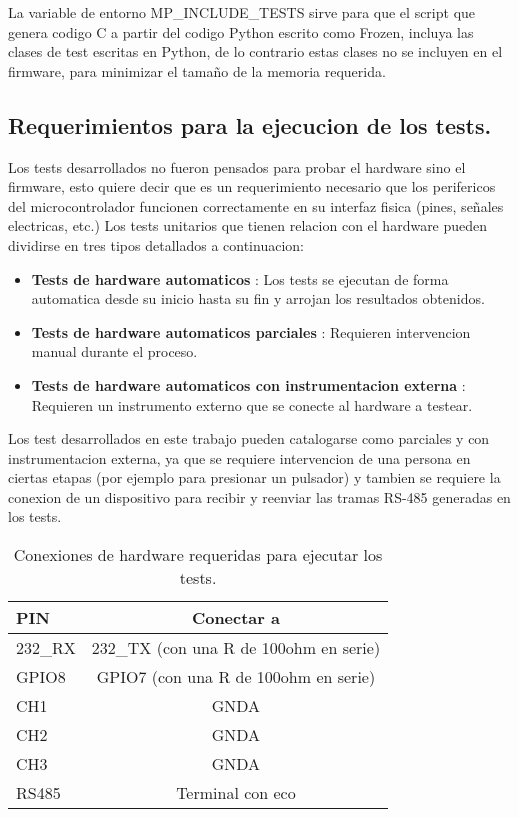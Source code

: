 La variable de entorno MP\_INCLUDE\_TESTS sirve para que el script que genera codigo C a partir del codigo Python escrito como Frozen, incluya las clases de test escritas en Python, de lo contrario estas clases no se incluyen en el firmware, para minimizar el tamaño de la memoria requerida.

\subsection{Requerimientos para la ejecucion de los tests.}
\label{sec:requerimientosEjecucionTests}

Los tests desarrollados no fueron pensados para probar el hardware sino el firmware, esto quiere decir que es un requerimiento necesario que los perifericos del microcontrolador funcionen correctamente en su interfaz fisica (pines, señales electricas, etc.)
Los tests unitarios que tienen relacion con el hardware pueden dividirse en tres tipos\cite{tdd} detallados a continuacion:

\begin{itemize}
	\item \textbf{Tests de hardware automaticos} : Los tests se ejecutan de forma automatica desde su inicio hasta su fin y arrojan los resultados obtenidos.
	\item \textbf{Tests de hardware automaticos parciales} : Requieren intervencion manual durante el proceso.
	\item \textbf{Tests de hardware automaticos con instrumentacion externa} : Requieren un instrumento externo que se conecte al hardware a testear.
\end{itemize}

Los test desarrollados en este trabajo pueden catalogarse como parciales y con instrumentacion externa, ya que se requiere intervencion de una persona en ciertas etapas (por ejemplo para presionar un pulsador) y tambien se requiere la conexion de un dispositivo para recibir y reenviar las tramas RS-485 generadas en los tests.

\begin{table}[h]
	\centering
	\caption[]{Conexiones de hardware requeridas para ejecutar los tests.}
	\begin{tabular}{l c}    
		\toprule
		\textbf{PIN} 	 	& \textbf{Conectar a}   									\\
		\midrule
		232\_RX	 				& 232\_TX (con una R de 100ohm en serie)		\\	
		GPIO8	 					& GPIO7 (con una R de 100ohm en serie)		\\		
		CH1	 						& GNDA																		\\		
		CH2	 						& GNDA																		\\		
		CH3	 						& GNDA																		\\		
		RS485						& Terminal con eco												\\
		\bottomrule
		\hline
	\end{tabular}
	\label{tab:hardreq}
\end{table}

